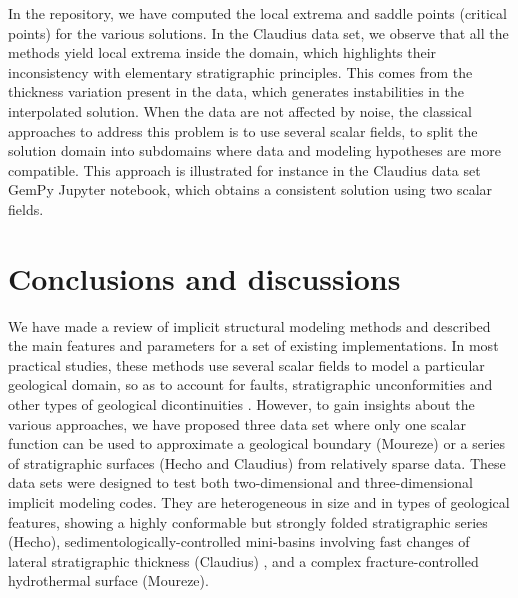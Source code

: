\documentclass[preprint]{ring20}
\begin{document}
In the repository, we have computed the local extrema and saddle points (critical points) for the various solutions. In the Claudius data set, we observe that all the methods yield local extrema inside the domain, which highlights their inconsistency with elementary stratigraphic principles. This comes from the thickness variation present in the data, which generates instabilities in the interpolated solution. When the data are not affected by noise, the classical approaches to address this problem is to use several scalar fields, to split the solution domain into subdomains where data and modeling hypotheses are more compatible. This approach is illustrated for instance in the Claudius data set GemPy Jupyter notebook, which obtains a consistent solution using two scalar fields. 


 


\section*{Conclusions and discussions}
\label{sec:conclu}
We have made a review of implicit structural modeling methods and described the main features and parameters for a set of existing implementations. In most practical studies, these methods use several scalar fields to model a particular geological domain, so as to account for faults, stratigraphic unconformities and other types of geological dicontinuities \citep{Wellmann2018AiG}. However, to gain insights about the various approaches, we have proposed three data set where only one scalar function can be used to approximate a geological boundary (Moureze) or a series of stratigraphic surfaces (Hecho and Claudius) from relatively sparse data. 
These data sets were designed to test both two-dimensional and three-dimensional implicit modeling codes. They are heterogeneous in size and in types of geological features, showing a highly conformable but strongly folded stratigraphic series (Hecho), sedimentologically-controlled mini-basins involving fast changes of lateral stratigraphic thickness (Claudius) , and a complex fracture-controlled hydrothermal surface (Moureze). 
\end{document}
